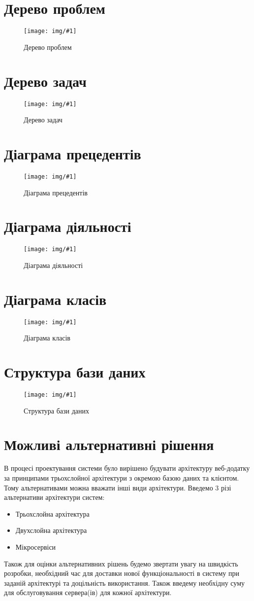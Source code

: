 \documentclass[14pt,a4paper,oneside]{extbook}
\newcommand{\DefaultFigure}[3]{
	\begin{figure}[H]
		\centering
		\texttt{[image: img/\#1]}
		\caption{#2}
		\label{pic:#3}
	\end{figure}
}
\begin{document}
\chapter{Дерево проблем}
	\DefaultFigure{ProblemsDiagram.jpg}{Дерево проблем}{ProblemsDiag}
\chapter{Дерево задач}
	\DefaultFigure{TaskDiagram.jpg}{Дерево задач}{TaskDiag}
\chapter{Діаграма прецедентів}
	\DefaultFigure{UseCaseDiagram.png}{Діаграма прецедентів}{UCDiag}
\chapter{Діаграма діяльності}
	\DefaultFigure{ActivityDiagram.png}{Діаграма діяльності}{ActivityDiag}
\chapter{Діаграма класів}
	\DefaultFigure{ClassDiagram.drawio.png}{Діаграма класів}{ClassDiag}
\chapter{Структура бази даних}
	\DefaultFigure{ER.drawio.png}{Структура бази даних}{ERDiag}	
\chapter{Можливі альтернативні рішення}
	В процесі проектування системи було вирішено будувати архітектуру веб-додатку за принципами трьохслойної архітектури з окремою базою даних та клієнтом. Тому альтернативами можна вважати інші види архітектури.  Введемо 3 різі альтернативи архітектури систем:
	\begin{itemize}
		\item Трьохслойна архітектура
		\item Двухслойна архітектура
		\item Мікросервіси
	\end{itemize}

	Також для оцінки альтернативних рішень будемо звертати увагу на швидкість розробки, необхідний час для доставки нової функціональності в систему при заданій архітектурі та доцільність використання. Також введему необхідну суму для обслуговування сервера(ів) для кожної архітектури.
\end{document}
